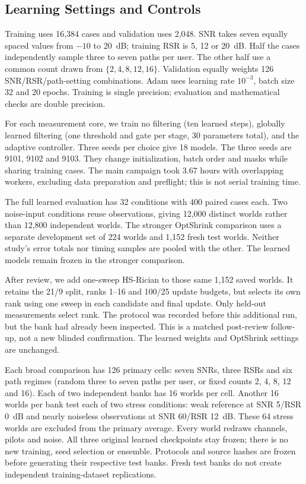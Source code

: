 \documentclass[10pt,journal,letterpaper]{IEEEtran}
\begin{document}
\subsection{Learning Settings and Controls}
Training uses 16,384 cases and validation uses 2,048. SNR takes seven equally spaced values from $-10$ to 20~dB; training RSR is 5, 12 or 20~dB. Half the cases independently sample three to seven paths per user. The other half use a common count drawn from $\{2,4,8,12,16\}$. Validation equally weights 126 SNR/RSR/path-setting combinations. Adam uses learning rate $10^{-3}$, batch size 32 and 20 epochs. Training is single precision; evaluation and mathematical checks are double precision.

For each measurement core, we train no filtering (ten learned steps), globally learned filtering (one threshold and gate per stage, 30 parameters total), and the adaptive controller. Three seeds per choice give 18 models. The three seeds are 9101, 9102 and 9103. They change initialization, batch order and masks while sharing training cases. The main campaign took 3.67 hours with overlapping workers, excluding data preparation and preflight; this is not serial training time.

The full learned evaluation has 32 conditions with 400 paired cases each. Two noise-input conditions reuse observations, giving 12,000 distinct worlds rather than 12,800 independent worlds. The stronger OptShrink comparison uses a separate development set of 224 worlds and 1,152 fresh test worlds. Neither study's error totals nor timing samples are pooled with the other. The learned models remain frozen in the stronger comparison.

After review, we add one-sweep HS-Rician to those same 1,152 saved worlds. It retains the 21/9 split, ranks 1--16 and 100/25 update budgets, but selects its own rank using one sweep in each candidate and final update. Only held-out measurements select rank. The protocol was recorded before this additional run, but the bank had already been inspected. This is a matched post-review follow-up, not a new blinded confirmation. The learned weights and OptShrink settings are unchanged.

Each broad comparison has 126 primary cells: seven SNRs, three RSRs and six path regimes (random three to seven paths per user, or fixed counts 2, 4, 8, 12 and 16). Each of two independent banks has 16 worlds per cell. Another 16 worlds per bank test each of two stress conditions: weak reference at SNR 5/RSR 0~dB and nearly noiseless observations at SNR 60/RSR 12~dB. These 64 stress worlds are excluded from the primary average. Every world redraws channels, pilots and noise. All three original learned checkpoints stay frozen; there is no new training, seed selection or ensemble. Protocols and source hashes are frozen before generating their respective test banks. Fresh test banks do not create independent training-dataset replications.
\end{document}
